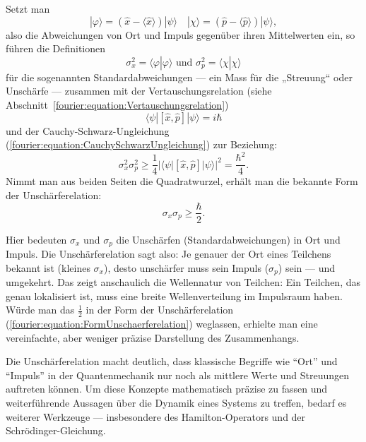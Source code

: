 		Setzt man
		\begin{equation}
			|\varphi\rangle = (\hat{x} - \langle \hat{x} \rangle) |\psi\rangle \quad |\chi\rangle = (\hat{p} - \langle \hat{p} \rangle) | \psi\rangle,
		\end{equation}
		also die Abweichungen von Ort und Impuls gegenüber ihren Mittelwerten ein, so führen die Definitionen
		\begin{equation}
			\sigma_x^2 = \langle\varphi | \varphi\rangle \text{ und } \sigma_p^2 = \langle\chi | \chi\rangle
		\end{equation}
		für die sogenannten Standardabweichungen --- ein Mass für die „Streuung“ oder Unschärfe --- zusammen mit der Vertauschungsrelation (siehe Abschnitt~\ref{fourier:equation:Vertauschungsrelation})
		\begin{equation}
			\langle\psi | [\hat{x},\hat{p}] | \psi\rangle = i\hbar
		\end{equation}
		und der Cauchy-Schwarz-Ungleichung (\ref{fourier:equation:CauchySchwarzUngleichung}) zur Beziehung:
		\begin{equation}
			\sigma_x^2 \sigma_p^2 \ge \frac{1}{4} |\langle\psi | [\hat{x},\hat{p}] | \psi\rangle|^2 = \frac{\hbar^2}{4}.
		\end{equation}
		Nimmt man aus beiden Seiten die Quadratwurzel, erhält man die bekannte Form der Unschärferelation:
		\begin{equation}\label{fourier:equation:FormUnschaerferelation}
			\sigma_x \sigma_p \ge \frac{\hbar}{2}.
		\end{equation}

		Hier bedeuten $\sigma_x$ und $\sigma_p$ die Unschärfen (Standardabweichungen) in Ort und Impuls.
		Die Unschärferelation sagt also:
		Je genauer der Ort eines Teilchens bekannt ist (kleines $\sigma_x$), desto unschärfer muss sein Impuls ($\sigma_p$) sein --- und umgekehrt.
		Das zeigt anschaulich die Wellennatur von Teilchen:
		Ein Teilchen, das genau lokalisiert ist, muss eine breite Wellenverteilung im Impulsraum haben.
		Würde man das $\tfrac{1}{2}$ in der Form der Unschärferelation (\ref{fourier:equation:FormUnschaerferelation}) weglassen, erhielte man eine vereinfachte, aber weniger präzise Darstellung des Zusammenhangs.

		Die Unschärferelation macht deutlich, dass klassische Begriffe wie ``Ort'' und ``Impuls'' in der Quantenmechanik nur noch als mittlere Werte und Streuungen auftreten können.
		Um diese Konzepte mathematisch präzise zu fassen und weiterführende Aussagen über die Dynamik eines Systems zu treffen, bedarf es weiterer Werkzeuge ---
		insbesondere des Hamilton-Operators und der Schrödinger-Gleichung.

